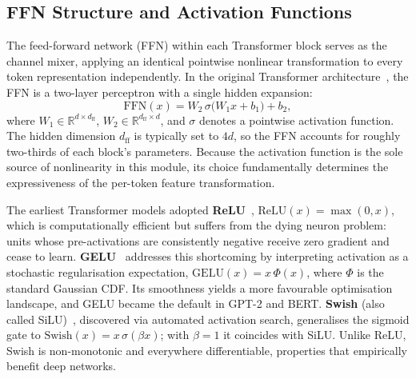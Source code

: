 
\subsection{FFN Structure and Activation Functions}
\label{subsec:ffn_activation}

The feed-forward network (FFN) within each Transformer block serves as the channel mixer, applying an identical pointwise nonlinear transformation to every token representation independently.
In the original Transformer architecture~\cite{vaswani2017attention}, the FFN is a two-layer perceptron with a single hidden expansion:
\begin{equation}
\label{eq:vanilla_ffn}
\mathrm{FFN}(x) = W_2 \,\sigma\!\bigl(W_1 x + b_1\bigr) + b_2,
\end{equation}
where $W_1 \in \mathbb{R}^{d \times d_{\mathrm{ff}}}$, $W_2 \in \mathbb{R}^{d_{\mathrm{ff}} \times d}$, and $\sigma$ denotes a pointwise activation function.
The hidden dimension $d_{\mathrm{ff}}$ is typically set to $4d$, so the FFN accounts for roughly two-thirds of each block's parameters.
Because the activation function is the sole source of nonlinearity in this module, its choice fundamentally determines the expressiveness of the per-token feature transformation.

The earliest Transformer models adopted \textbf{ReLU}~\cite{agarap2018deep}, $\mathrm{ReLU}(x)=\max(0,x)$, which is computationally efficient but suffers from the dying neuron problem: units whose pre-activations are consistently negative receive zero gradient and cease to learn.
\textbf{GELU}~\cite{hendrycks2016gaussian} addresses this shortcoming by interpreting activation as a stochastic regularisation expectation, $\mathrm{GELU}(x)=x\,\Phi(x)$, where $\Phi$ is the standard Gaussian CDF.
Its smoothness yields a more favourable optimisation landscape, and GELU became the default in GPT-2 and BERT.
\textbf{Swish} (also called SiLU)~\cite{ramachandran2017searching}, discovered via automated activation search, generalises the sigmoid gate to $\mathrm{Swish}(x)=x\,\sigma(\beta x)$; with $\beta=1$ it coincides with SiLU.
Unlike ReLU, Swish is non-monotonic and everywhere differentiable, properties that empirically benefit deep networks.

